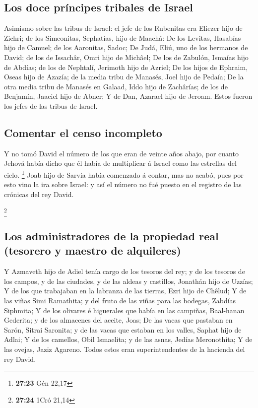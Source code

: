 \hypertarget{los-doce-pruxedncipes-tribales-de-israel}{%
\subsection{Los doce príncipes tribales de
Israel}\label{los-doce-pruxedncipes-tribales-de-israel}}

 Asimismo sobre las tribus de Israel: el jefe de los
Rubenitas era Eliezer hijo de Zichri; de los Simeonitas, Sephatías, hijo
de Maachâ:  De los Levitas, Hasabías hijo de Camuel; de
los Aaronitas, Sadoc;  De Judá, Eliú, uno de los hermanos
de David; de los de Issachâr, Omri hijo de Michâel;  De
los de Zabulón, Ismaías hijo de Abdías; de los de Nephtalí, Jerimoth
hijo de Azriel;  De los hijos de Ephraim, Oseas hijo de
Azazía; de la media tribu de Manasés, Joel hijo de Pedaía;
 De la otra media tribu de Manasés en Galaad, Iddo hijo
de Zachârías; de los de Benjamín, Jaaciel hijo de Abner; 
Y de Dan, Azarael hijo de Jeroam. Estos fueron los jefes de las tribus
de Israel.

\hypertarget{comentar-el-censo-incompleto}{%
\subsection{Comentar el censo
incompleto}\label{comentar-el-censo-incompleto}}

 Y no tomó David el número de los que eran de veinte años
abajo, por cuanto Jehová había dicho que él había de multiplicar á
Israel como las estrellas del cielo. \footnote{\textbf{27:23} Gén 22,17}
 Joab hijo de Sarvia había comenzado á contar, mas no
acabó, pues por esto vino la ira sobre Israel: y así el número no fué
puesto en el registro de las crónicas del rey David.

\footnote{\textbf{27:24} 1Cró 21,14}

\hypertarget{los-administradores-de-la-propiedad-real-tesorero-y-maestro-de-alquileres}{%
\subsection{Los administradores de la propiedad real (tesorero y maestro
de
alquileres)}\label{los-administradores-de-la-propiedad-real-tesorero-y-maestro-de-alquileres}}

 Y Azmaveth hijo de Adiel tenía cargo de los tesoros del
rey; y de los tesoros de los campos, y de las ciudades, y de las aldeas
y castillos, Jonathán hijo de Uzzías;  Y de los que
trabajaban en la labranza de las tierras, Ezri hijo de Chêlud;
 Y de las viñas Simi Ramathita; y del fruto de las viñas
para las bodegas, Zabdías Siphmita;  Y de los olivares é
higuerales que había en las campiñas, Baal-hanan Gederita; y de los
almacenes del aceite, Joas;  De las vacas que pastaban en
Sarón, Sitrai Saronita; y de las vacas que estaban en los valles, Saphat
hijo de Adlai;  Y de los camellos, Obil Ismaelita; y de
las asnas, Jedías Meronothita;  Y de las ovejas, Jaziz
Agareno. Todos estos eran superintendentes de la hacienda del rey David.

